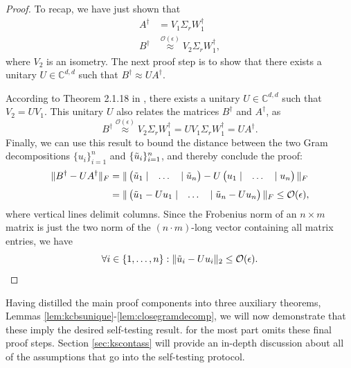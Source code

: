 \begin{proof}
To recap, we have just shown that
\begin{align*}
A^{\dag} & =V_1\Sigma_r W_1^{\dag} \\[0.3em]
B^{\dag} & \stackrel{\mathcal{O}(\epsilon)}{\approx} V_2\Sigma_r W_1^{\dag},
\end{align*}
where $V_2$ is an isometry. The next proof step is to show that there exists a unitary $U\in\mathbb{C}^{d,d}$ such that $B^{\dag}\approx U A^{\dag}$.

According to Theorem 2.1.18 in \cite{Horn2013}, there exists a unitary $U\in\mathbb{C}^{d,d}$ such that $V_2=UV_1$. This unitary $U$ also relates the matrices $B^{\dag}$ and $A^{\dag}$, as
\begin{equation*}
B^{\dag}\stackrel{\mathcal{O}(\epsilon)}{\approx}V_2\Sigma_r W_1^{\dag}= UV_1\Sigma_r W_1^{\dag}=UA^{\dag}.
\end{equation*} 
Finally, we can use this result to bound the distance between the two Gram decompositions $\{u_i\}_{i=1}^n$ and $\{\Tilde{u}_i\}_{i=1}^n$, and thereby conclude the proof:
\begin{align*}
\|B^{\dag}-UA^{\dag}\|_F&=\|
\begin{pmatrix}
\Tilde{u}_1 \;| & \dots & |\; \Tilde{u}_n
\end{pmatrix}-U
\begin{pmatrix}
u_1 \;| & \dots &  | \; u_n
\end{pmatrix} \|_F \\[0.3em]
& = \|
\begin{pmatrix}
\Tilde{u}_1-U u_1\; | &\dots& |\;\Tilde{u}_n-U u_n
\end{pmatrix}
\|_F\leq\mathcal{O}(\epsilon),
\end{align*}
where vertical lines delimit columns.
Since the Frobenius norm of an $n\times m$ matrix is just the two norm of the $(n\cdot m)$-long vector containing all matrix entries, we have
\begin{equation*}
\forall i\in\{1,\dots,n\}: \|\Tilde{u}_i-U u_i\|_2 \leq \mathcal{O}(\epsilon).
\end{equation*}
\end{proof}

Having distilled the main proof components into three auxiliary theorems, Lemmas \ref{lem:kcbsunique}-\ref{lem:closegramdecomp}, we will now demonstrate that these imply the desired self-testing result. \cite{Bharti2019} for the most part omits these final proof steps. Section \ref{sec:kscontass} will provide an in-depth discussion about all of the assumptions that go into the self-testing protocol.

